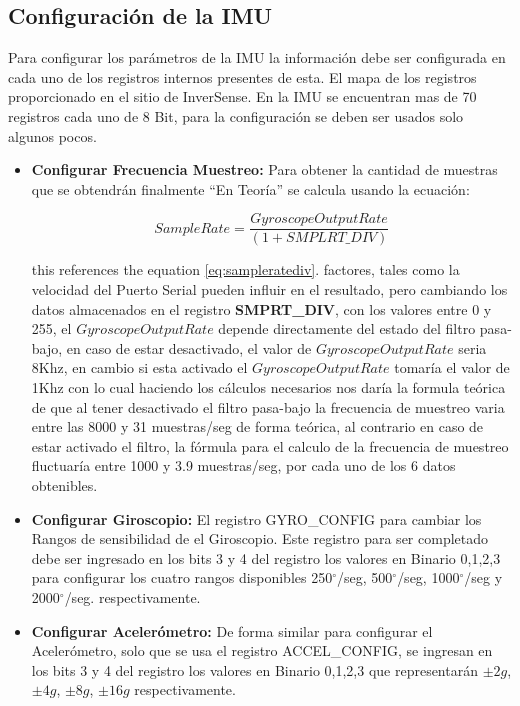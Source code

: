 \documentclass[12pt,a4paper]{article}
\newcommand{\grad}{$^{\circ}$}
\begin{document}
\subsection{Configuración de la IMU}
Para configurar los parámetros de la IMU la información debe ser configurada en cada uno de los registros internos presentes de esta. El mapa de los registros \cite{MAPREGISTER} proporcionado  en el sitio de InverSense.
\newline En la IMU se encuentran mas de 70 registros cada uno de 8 Bit, para la configuración se deben ser usados solo algunos pocos.
\begin{itemize}
\item \textbf{Configurar Frecuencia Muestreo:} Para obtener la cantidad de muestras que se obtendrán finalmente ``En Teoría'' se calcula usando la ecuación: 

\begin{equation} 
\label{eq:sampleratediv}
Sample Rate = \frac{Gyroscope Output Rate}{(1 + SMPLRT\_DIV) }
\end{equation}

this references the equation \ref{eq:sampleratediv}.
factores, tales como la velocidad del Puerto Serial pueden influir en el resultado, pero cambiando los datos almacenados en el registro \textbf{SMPRT\_DIV}, con los valores entre 0 y 255, el $Gyroscope Output Rate$ depende directamente del estado del filtro pasa-bajo, en caso de estar desactivado, el valor de $Gyroscope Output Rate$ seria 8Khz, en cambio si esta activado el $Gyroscope Output Rate$ tomaría el valor de 1Khz con lo cual haciendo los cálculos necesarios nos daría la formula teórica de que al tener desactivado el filtro pasa-bajo la frecuencia de muestreo varia entre las 8000 y 31 muestras/seg de forma teórica, al contrario en caso de estar activado el filtro, la fórmula para el calculo de la frecuencia de muestreo fluctuaría entre 1000 y 3.9 muestras/seg, por cada uno de los 6 datos obtenibles.

\item \textbf{Configurar Giroscopio:} El registro GYRO\_CONFIG para cambiar los Rangos de sensibilidad de el Giroscopio. Este registro para ser completado debe ser ingresado en los bits 3 y 4 del registro los valores en Binario 0,1,2,3 para configurar los cuatro rangos disponibles 250\grad/seg, 500\grad/seg, 1000\grad/seg y 2000\grad/seg. respectivamente.

\item \textbf{Configurar Acelerómetro:} De forma similar para configurar el Acelerómetro, solo que se usa el registro ACCEL\_CONFIG, se ingresan en los bits 3 y 4 del registro los valores en Binario 0,1,2,3 que representarán $\pm 2g$, $\pm 4g$, $\pm 8g$, $\pm 16g$ respectivamente.

\end{itemize}
\end{document}
